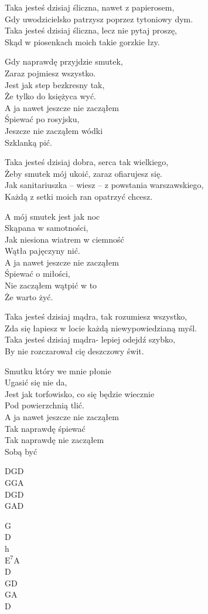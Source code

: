 \begin{text}
Taka jesteś dzisiaj śliczna, nawet z papierosem,\\
Gdy uwodzicielsko patrzysz poprzez tytoniowy dym.\\
Taka jesteś dzisiaj śliczna, lecz nie pytaj proszę,\\
Skąd w piosenkach moich takie gorzkie łzy.

\vin Gdy naprawdę przyjdzie smutek,\\
\vin Zaraz pojmiesz wszystko.\\
\vin Jest jak step bezkresny tak,\\
\vin Że tylko do księżyca wyć.\\
\vin A ja nawet jeszcze nie zacząłem\\
\vin Śpiewać po rosyjsku,\\
\vin Jeszcze nie zacząłem wódki\\
\vin Szklanką pić.

Taka jesteś dzisiaj dobra, serca tak wielkiego,\\
Żeby smutek mój ukoić, zaraz ofiarujesz się.\\
Jak sanitariuszka – wiesz – z powstania warszawskiego,\\
Każdą z setki moich ran opatrzyć chcesz.

\vin A mój smutek jest jak noc\\
\vin Skąpana w samotności,\\
\vin Jak niesiona wiatrem w ciemność\\
\vin Wątła pajęczyny nić.\\
\vin A ja nawet jeszcze nie zacząłem\\
\vin Śpiewać o miłości,\\
\vin Nie zacząłem wątpić w to\\
\vin Że warto żyć.

Taka jesteś dzisiaj mądra, tak rozumiesz wszystko,\\
Zda się łapiesz w locie każdą niewypowiedzianą myśl.\\
Taka jesteś dzisiaj mądra- lepiej odejdź szybko,\\
By nie rozczarował cię deszczowy świt.

\vin Smutku który we mnie płonie\\
\vin Ugasić się nie da,\\
\vin Jest jak torfowisko, co się będzie wiecznie\\
\vin Pod powierzchnią tlić.\\
\vin A ja nawet jeszcze nie zacząłem\\
\vin Tak naprawdę śpiewać\\
\vin Tak naprawdę nie zacząłem\\
\vin Sobą być
\end{text}
\begin{chord}
DGD\\
GGA\\
DGD\\
GAD

G\\
D\\
h\\
$\mathrm{E^7}$A\\
D\\
GD\\
GA\\
D
\end{chord}

